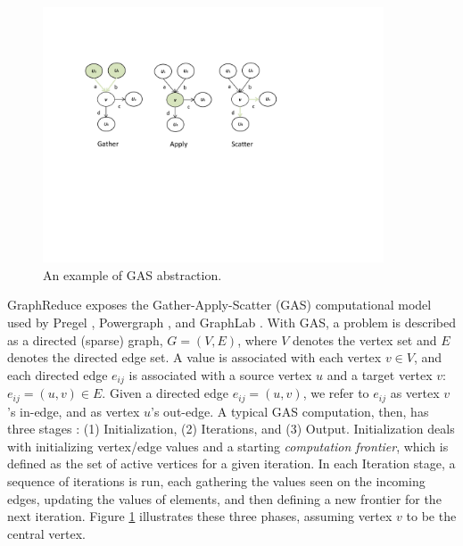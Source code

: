 \begin{figure}[!t]
\centering
\includegraphics[width=0.9\textwidth,height=\textheight,keepaspectratio]{figures/phases.pdf}
\caption{An example of GAS abstraction. }
\label{fig:phases}
\end{figure}


GraphReduce exposes the Gather-Apply-Scatter (GAS) computational model used by Pregel \cite{pregel}, Powergraph \cite{powergraph}, and GraphLab \cite{graphlab}.
With GAS, a problem is described as a directed (sparse) graph, $G = (V, E)$, where $V$ denotes the vertex set and $E$ denotes 
the directed edge set. A value is associated with each vertex $v\in V$, and each directed edge $e_{ij}$ is associated with 
a source vertex $u$ and a target vertex $v$: $e_{ij} =(u, v) \in E$. Given a directed edge $e_{ij} = (u, v)$, we refer to 
$e_{ij}$ as vertex $v$'s in-edge, and as vertex $u$'s out-edge. A typical GAS computation, then, has three stages \cite{vertexapi}: 
(1) Initialization, (2) Iterations, and (3) Output. Initialization deals with initializing vertex/edge values and a starting 
{\em computation frontier}, which is defined as the set of active vertices for a given iteration. In each Iteration stage, 
a sequence of iterations is run, each gathering the values seen on the incoming edges, updating the values of elements, and 
then defining a new frontier for the next iteration. Figure \ref{fig:phases} illustrates these three phases, assuming vertex $v$ to be the 
central vertex.



